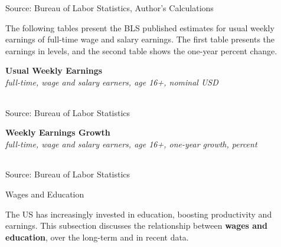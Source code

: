 \documentclass{report}
\newcommand{\tbllink}[1]{\href{https://raw.githubusercontent.com/bdecon/US-chartbook/master/chartbook/data/#1}{\faTable}}
\begin{document}
{\begin{minipage}{0.76\textwidth}
\footnotesize{Source: Bureau of Labor Statistics, Author's Calculations} \hfill \tbllink{uwe_bls_gr.csv} \ \ \tbllink{uwe_cps.csv}
\vspace{2mm}

\small The following tables present the BLS published estimates for usual weekly earnings of full-time wage and salary earnings. The first table presents the earnings in levels, and the second table shows the one-year percent change.
\vspace{2mm}

\normalsize \textbf{Usual Weekly Earnings}\\
\footnotesize{\textit{full-time, wage and salary earners, age 16+, nominal USD}}\\
 \setlength{\tabcolsep}{3.1pt} \color{black!90}
		{\renewcommand{\arraystretch}{1.55}
		 \begin{tabular}{p{17mm} R{8.8mm} R{8.8mm} R{8.8mm} R{8.8mm} R{8.8mm} R{8.8mm} 
		   R{8.8mm} R{8.8mm} R{8.8mm} R{8.8mm}}
			  \hline
		\end{tabular}}
\vspace{-3mm}
		
\footnotesize{Source: Bureau of Labor Statistics}
\vspace{3mm}

\normalsize \textbf{Weekly Earnings Growth}\\
\footnotesize{\textit{full-time, wage and salary earners, age 16+, one-year growth, percent}}\\
 \setlength{\tabcolsep}{3.1pt} \color{black!90}
	{\renewcommand{\arraystretch}{1.55}
		\begin{tabular}{p{17mm} R{8.8mm} R{8.8mm} R{8.8mm} R{8.8mm} R{8.8mm} R{8.8mm} 
		   R{8.8mm} R{8.8mm} R{8.8mm} R{8.8mm}}
			  \hline
		\end{tabular}}\vspace{-2mm}
				
\footnotesize{Source: Bureau of Labor Statistics}
\end{minipage}
\newpage
\vspace*{-10mm}

\begin{minipage}{0.76\textwidth}   
\normalsize{Wages and Education}
\vspace*{-1mm}

\small The US has increasingly invested in education, boosting productivity and earnings. This subsection discusses the relationship between \textbf{wages and education}, over the long-term and in recent data. 


\end{minipage}}
\end{document}
